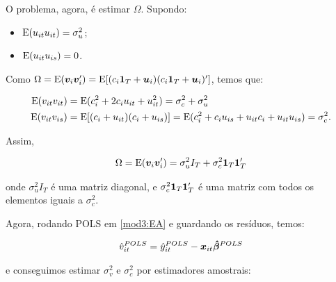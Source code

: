\documentclass[11pt, oneside, a4paper, article]{article}
\numberwithin{equation}{section}
\begin{document}
O problema, agora, é estimar $\Omega$.
Supondo:
\begin{itemize}\itemsep0pt
\item $\text{E}(u_{it}u_{it}) = \sigma_{u}^{2}$;
\item $\text{E}(u_{it}u_{is}) = 0$.
\end{itemize}
Como $\Omega = \text{E}(\boldsymbol{v}_{i} \boldsymbol{v}_{i}') = \text{E}[ ( c_{i} \boldsymbol{1}_{T} + \boldsymbol{u}_{i} ) ( c_{i} \boldsymbol{1}_{T} + \boldsymbol{u}_{i} )' ]$, temos que:

\vspace{-1 em}
\begin{align*} 
\text{E}(v_{it}v_{it}) &=
	\text{E}( c_{i}^{2} + 2c_{i} u_{it} + u_{it}^{2}) 
	=
	\sigma_{c}^{2} + \sigma_{u}^{2}
\\
\text{E}(v_{it}v_{is})	&=
	\text{E}[ ( c_{i} + u_{it} ) ( c_{i} + u_{is} ) ]
	=
	\text{E}( c_{i}^{2} + c_{i} u_{is} + u_{it} c_{i} + u_{it} u_{is} )
	=
	\sigma_{c}^{2}.
\end{align*}

Assim, 

\vspace{-1 em}
\begin{align*}
\Omega 
= 
\text{E}(\boldsymbol{v}_{i} \boldsymbol{v}_{i}') = \sigma^{2}_{u} I_{T} + \sigma_{c}^{2} \boldsymbol{1}_{T} \boldsymbol{1}_{T}'
\end{align*}

\noindent
onde
$\sigma^{2}_{u} I_{T}$ 
é uma matriz diagonal, e 
$\sigma_{c}^{2} \boldsymbol{1}_{T} \boldsymbol{1}_{T}'$ é uma matriz com todos os elementos iguais a $\sigma_{c}^{2}$.

Agora, rodando POLS em \eqref{mod3:EA} e guardando os resíduos, temos:

\vspace{-1 em}
\begin{align*}
\hat{v}_{it}^{POLS}
= 
\hat{y}_{it}^{POLS} - \boldsymbol{x}_{it} \boldsymbol{\hat{\beta}}^{POLS}
\end{align*}

\noindent
e conseguimos estimar $\sigma_{v}^{2}$ e $\sigma_{c}^{2}$ por estimadores amostrais:
\end{document}
